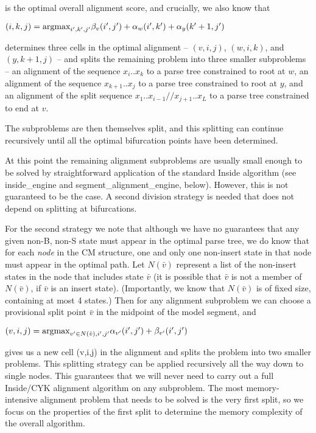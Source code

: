 \documentclass[11pt]{article}
\def\argmax{\mbox{\rm{argmax}}}      %
\begin{document}
is the optimal overall alignment score, and crucially, we also know
that

      $(i,k,j) = \argmax_{i',k',j'}  \beta_{v}(i',j') +  \alpha_{w}(i',k') + \alpha_{y}(k'+1,j') $

determines three cells in the optimal alignment -- $(v,i,j)$,
$(w,i,k)$, and $(y,k+1,j)$ -- and splits the remaining problem into
three smaller subproblems -- an alignment of the sequence
$x_{i}..x_{k}$ to a parse tree constrained to root at $w$, an
alignment of the sequence $x_{k+1}..x_{j}$ to a parse tree constrained
to root at $y$, and an alignment of the split sequence
$x_1..x_{i-1}//x_{j+1}..x_L$ to a parse tree constrained to end at
$v$.

The subproblems are then themselves split, and this splitting can
continue recursively until all the optimal bifurcation points have
been determined.

At this point the remaining alignment subproblems are usually small
enough to be solved by straightforward application of the standard
Inside algorithm (see inside\_engine and segment\_alignment\_engine,
below). However, this is not guaranteed to be the case. A second
division strategy is needed that does not depend on splitting at
bifurcations.

For the second strategy we note that although we have no guarantees
that any given non-B, non-S state must appear in the optimal parse
tree, we do know that for each \emph{node} in the CM structure, one
and only one non-insert state in that node must appear in the optimal
path. Let $N(\bar{v})$ represent a list of the non-insert states in
the node that includes state $\bar{v}$ (it is possible that $\bar{v}$
is not a member of $N(\bar{v})$, if $\bar{v}$ is an insert
state). (Importantly, we know that $N(\bar{v})$ is of fixed size,
containing at most 4 states.) Then for any alignment subproblem we can
choose a provisional split point $\bar{v}$ in the midpoint of the
model segment, and

$(v,i,j) = \argmax_{v' \in N(\hat{v}),i',j'} \alpha_{v'}(i',j') + \beta_{v'}(i',j')$

gives us a new cell (v,i,j) in the alignment and splits the problem
into two smaller problems. This splitting strategy can be applied
recursively all the way down to single nodes. This guarantees that we
will never need to carry out a full Inside/CYK alignment algorithm on
any subproblem. The most memory-intensive alignment problem that needs
to be solved is the very first split, so we focus on the properties of
the first split to determine the memory complexity of the overall
algorithm.
\end{document}
